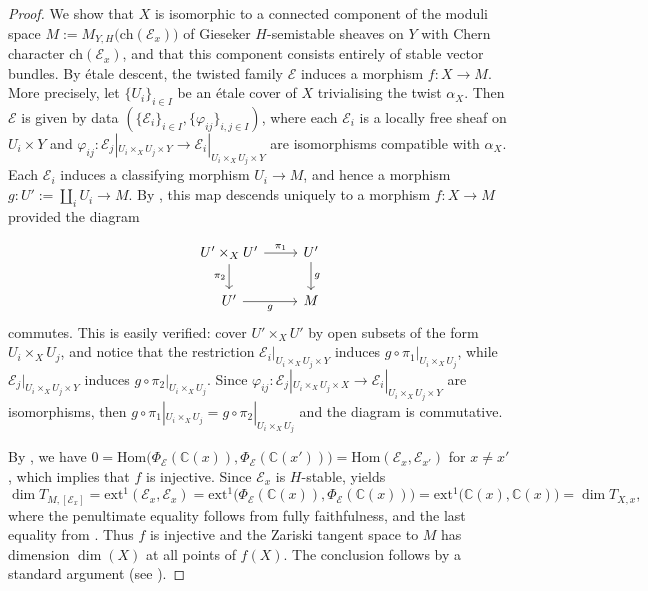 \documentclass[12pt,a4paper]{amsart}
\theoremstyle{plain}
\theoremstyle{definition}
\theoremstyle{remark}
\def\ch{\mathrm{ch}}
\def\Hom{\mathrm{Hom}}
\def\ext{\mathrm{ext}}
\newcommand{\kE}{\mathcal{E}}
\begin{document}
\begin{proof}
We show that $X$ is isomorphic to a connected component of the moduli space $M:=M_{Y,H}\!\bigl(\ch(\kE_{x})\bigr)$ of Gieseker $H$-semistable sheaves on $Y$ with Chern character $\ch(\kE_{x})$, and that this component consists entirely of stable vector bundles. By \'{e}tale descent, the twisted family $\mathcal{E}$ induces a morphism $f\colon X\to M$. More precisely, let $\{U_i\}_{i\in I}$ be an \'etale cover of $X$ trivialising the twist $\alpha_{X}$. Then $\mathcal{E}$ is given by data $(\{\mathcal{E}_i\}_{i\in I},\{\varphi_{ij}\}_{i,j\in I})$, where each $\mathcal{E}_i$ is a locally free sheaf on $U_i\times Y$ and $\varphi_{ij}\colon\mathcal{E}_j|_{U_i\times_X U_j\times Y}\rightarrow\mathcal{E}_i|_{U_i\times_X U_j\times Y}$ are isomorphisms compatible with $\alpha_{X}$. Each $\mathcal{E}_i$ induces a classifying morphism $U_i\rightarrow M$, and hence a morphism $g\colon U':=\coprod_i U_i\rightarrow M$. By \cite[Proposition 3.1.7]{Alper-StacksModuli}, this map descends uniquely to a morphism $f\colon X\rightarrow M$ provided the diagram
   
\[\begin{tikzcd}
	{U'\times_XU'} & {U'} \\
	{U'} & M
	\arrow["{\pi_1}", from=1-1, to=1-2]
	\arrow["{\pi_2}"', from=1-1, to=2-1]
	\arrow["g", from=1-2, to=2-2]
	\arrow["g"', from=2-1, to=2-2]
\end{tikzcd}\]
    commutes. This is easily verified: cover $U'\times_XU'$ by open subsets of the form $U_i\times_X U_j$, and notice that the restriction $\mathcal{E}_i|_{U_i\times_X U_j\times Y}$ induces $g\circ\pi_1|_{U_i\times_X U_j}$, while $\mathcal{E}_j|_{U_i\times_X U_j\times Y}$ induces $g\circ\pi_2|_{U_i\times_X U_j}$. Since $\varphi_{ij}\colon\mathcal{E}_j|_{U_i\times_X U_j\times X}\rightarrow\mathcal{E}_i|_{U_i\times_X U_j\times Y}$ are isomorphisms, then $g\circ\pi_1|_{U_i\times_X U_j}=g\circ\pi_2|_{U_i\times_X U_j}$ and the diagram is commutative.

By \cite[Theorem 3.2.1]{caldararu-thesis}, we have
$0=\Hom\bigl(\Phi_{\kE}(\mathbb{C}(x)),\Phi_{\kE}(\mathbb{C}(x'))\bigr)=\Hom(\mathcal{E}_x,\mathcal{E}_{x'})$ for $x\neq x'$, which implies that $f$ is injective.
Since $\mathcal{E}_x$ is $H$-stable, \cite[Proposition 4.5.2]{HL10} yields
\[
\dim T_{M,[\mathcal{E}_x]}
  = \ext^1(\mathcal{E}_x,\mathcal{E}_x)
  = \ext^1\bigl(\Phi_{\kE}(\mathbb{C}(x)),\Phi_{\kE}(\mathbb{C}(x))\bigr)
  = \ext^1\bigl(\mathbb{C}(x),\mathbb{C}(x)\bigr)
  = \dim T_{X,x},
\]
where the penultimate equality follows from fully faithfulness, and the last equality from \cite[Ex.~11.9 ii)]{Huy03}.
Thus $f$ is injective and the Zariski tangent space to $M$ has dimension $\dim(X)$ at all points of $f(X)$.
The conclusion follows by a standard argument (see \cite[Lemma 1.6]{reede-zhang-smooth-components}).
\end{proof}
\end{document}
